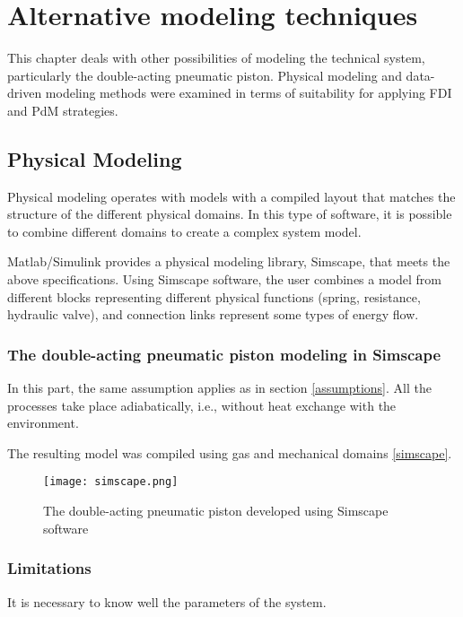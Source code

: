\chapter{Alternative modeling techniques}

This chapter deals with other possibilities of modeling the technical
system, particularly the double-acting pneumatic piston. Physical modeling
and data-driven modeling methods were examined in terms of suitability for
applying FDI and PdM strategies.

\section{Physical Modeling}
Physical modeling operates with models with a compiled layout that matches
the structure of the different physical domains. In this type of software,
it is possible to combine different domains to create a complex system
model.

Matlab/Simulink provides a physical modeling library, Simscape, that meets
the above specifications. Using Simscape software, the user combines a
model from different blocks representing different physical functions
(spring, resistance, hydraulic valve), and connection links represent some
types of energy flow.



\subsection{The double-acting pneumatic piston modeling in Simscape}

In this part, the same assumption applies as in section \ref{assumptions}. All the
processes take place adiabatically, i.e., without heat exchange with the
environment. 

The resulting model was compiled using gas and mechanical domains \ref{simscape}.

\begin{figure}[h!]
    \centering
    \texttt{[image: simscape.png]}
    \caption{The double-acting pneumatic piston developed using Simscape
    software}
    \label{fig:simscape}
\end{figure}


\subsection{Limitations}

It is necessary to know well the parameters of the system.


